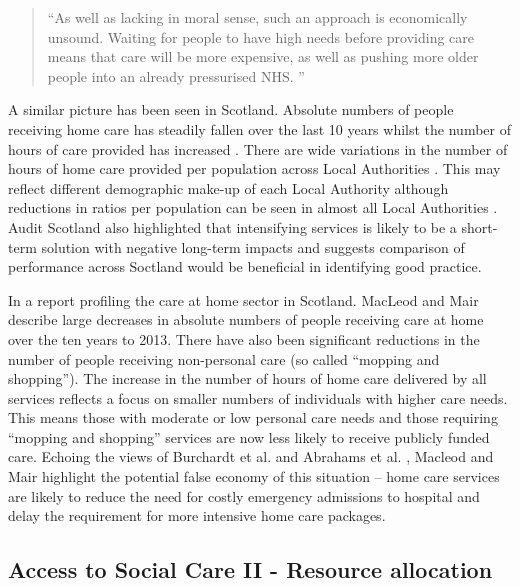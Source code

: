 \documentclass[12pt,]{report}
\begin{document}
\begin{quotation}
    “As well as lacking in moral sense, such an approach is economically unsound. Waiting for people to have high needs before providing care means that care will be more expensive, as well as pushing more older people into an already pressurised NHS. ” \end{quotation}

\citep[pp.5]{RN177}

A similar picture has been seen in Scotland. Absolute numbers of people
receiving home care has steadily fallen over the last 10 years whilst
the number of hours of care provided has increased \citep{RN128}. There
are wide variations in the number of hours of home care provided per
population across Local Authorities \citep{449, RN128}. This may reflect
different demographic make-up of each Local Authority although
reductions in ratios per population can be seen in almost all Local
Authorities \citep{RN128}. Audit Scotland \citeyearpar{RN449} also
highlighted that intensifying services is likely to be a short-term
solution with negative long-term impacts and suggests comparison of
performance across Soctland would be beneficial in identifying good
practice.

In a report profiling the care at home sector in Scotland. MacLeod and
Mair \citeyearpar{RN147} describe large decreases in absolute numbers of
people receiving care at home over the ten years to 2013. There have
also been significant reductions in the number of people receiving
non-personal care (so called ``mopping and shopping''). The increase in
the number of hours of home care delivered by all services reflects a
focus on smaller numbers of individuals with higher care needs. This
means those with moderate or low personal care needs and those requiring
``mopping and shopping'' services are now less likely to receive
publicly funded care. Echoing the views of Burchardt et al.
\citeyearpar{RN173} and Abrahams et al. \citeyearpar{RN177}, Macleod and
Mair \citeyearpar{RN147} highlight the potential false economy of this
situation -- home care services are likely to reduce the need for costly
emergency admissions to hospital and delay the requirement for more
intensive home care packages.

\subsection{Access to Social Care II - Resource allocation}\label{subsec:access-resources}
\end{document}
